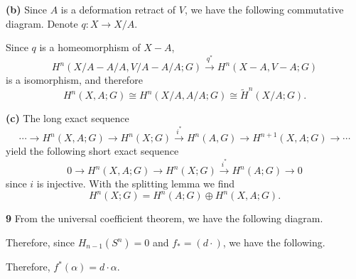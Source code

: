 \documentclass{article}
\makeatletter
\newcommand*{\shifttext}[1]{%
  \settowidth{\@tempdima}{#1}%
  \hspace{-\@tempdima}#1%
}
\newcommand{\plabel}[1]{%
\shifttext{\textbf{#1}\quad}%
}
\makeatother
\begin{document}
\plabel{(b)}%
Since $A$ is a deformation retract of $V$, we have the following commutative diagram.
Denote $q:X\rightarrow X/A$.
\begin{center}
\end{center}
Since $q$ is a homeomorphism of $X-A$,
\[ H^n(X/A-A/A,V/A-A/A;G) \xrightarrow{q^*} H^n(X-A,V-A;G) \]
is a isomorphism, and therefore
\[ H^n(X,A;G) \cong H^n(X/A,A/A;G) \cong \tilde{H}^n(X/A;G). \]

\plabel{(c)}%
The long exact sequence
\[ \cdots \rightarrow H^n(X,A;G) \rightarrow H^n(X;G) \xrightarrow{i^*} H^n(A,G) \rightarrow H^{n+1}(X,A;G) \rightarrow \cdots \]
yield the following short exact sequence
\[ 0 \rightarrow H^n(X,A;G) \rightarrow H^n(X;G) \xrightarrow{i^*} H^n(A;G) \rightarrow 0 \]
since $i$ is injective.
With the splitting lemma we find
\[ H^n(X;G) = H^n(A;G) \oplus H^n(X,A;G). \]

\plabel{9}%
From the universal coefficient theorem, we have the following diagram.
\begin{center}
\end{center}
Therefore, since $H_{n-1}(S^n) = 0$ and $f_* = (d\cdot{})$, we have the following.
\begin{center}
\end{center}
Therefore, $f^*(\alpha) = d\cdot\alpha$.
\end{document}
